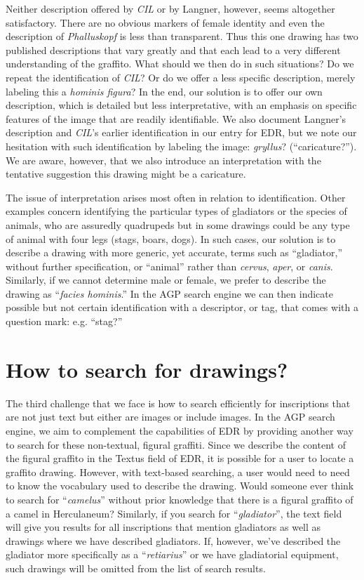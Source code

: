 \documentclass[amsthm,ebook]{saparticle}
\begin{document}
Neither description offered by \emph{CIL} or by Langner, however, seems altogether satisfactory. There are no obvious markers
of female identity and even the description of \emph{Phalluskopf} is less than transparent. Thus this one drawing has two
published descriptions that vary greatly and that each lead to a very different understanding of the graffito. What
should we then do in such situations? Do we repeat the identification of \emph{CIL}? Or do we offer a less specific
description, merely labeling this a \emph{hominis figura}? In the end, our solution is to offer our own description, which
is detailed but less interpretative, with an emphasis on specific features of the image that are readily identifiable.
We also document Langner’s description and \emph{CIL}’s earlier identification in our entry for EDR, but we note our
hesitation with such identification by labeling the image: \emph{gryllus}? (``caricature?''). We are aware, however, that we
also introduce an interpretation with the tentative suggestion this drawing might be a caricature. 

The issue of interpretation arises most often in relation to identification. Other examples concern identifying the
particular types of gladiators or the species of animals, who are assuredly quadrupeds but in some drawings could be
any type of animal with four legs (stags, boars, dogs). In such cases, our solution is to describe a drawing with more
generic, yet accurate, terms such as ``gladiator,'' without further specification, or ``animal'' rather than \emph{cervus}, \emph{aper},
or \emph{canis}. Similarly, if we cannot determine male or female, we prefer to describe the drawing as ``\emph{facies hominis}.'' In
the AGP search engine we can then indicate possible but not certain identification with a descriptor, or tag, that
comes with a question mark: e.g. ``stag?'' 




\section{How to search for drawings?}


\noindent The third challenge that we face is how to search efficiently for inscriptions that are not just text but either are
images or include images. In the AGP search engine, we aim to complement the capabilities of EDR by providing another
way to search for these non-textual, figural graffiti. Since we describe the content of the figural graffito in the
Textus field of EDR, it is possible for a user to locate a graffito drawing. However, with text-based searching, a user
would need to need to know the vocabulary used to describe the drawing. Would someone ever think to search for
``\emph{camelus}'' without prior knowledge that there is a figural graffito of a camel in Herculaneum? Similarly, if you
search for ``\emph{gladiator}'', the text field will give you results for all inscriptions that mention gladiators as well as
drawings where we have described gladiators. If, however, we’ve described the gladiator more specifically as a
``\emph{retiarius}'' or we have gladiatorial equipment, such drawings will be omitted from the list of search results.
\end{document}
